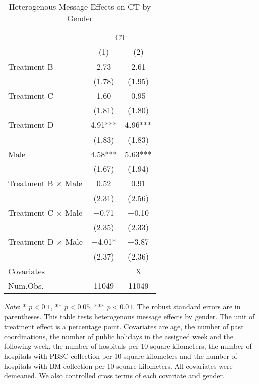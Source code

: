 \documentclass[12pt, a4paper]{article}
\begin{document}
\begin{table}[H]

\caption{\label{tab:lm-interaction-gender-test}Heterogenous Message Effects on CT by Gender}
\centering
\fontsize{8}{10}\selectfont
\begin{threeparttable}
\begin{tabular}[t]{>{\raggedright\arraybackslash}p{20em}cc}
\toprule
\multicolumn{1}{c}{ } & \multicolumn{2}{c}{CT} \\
\cmidrule(l{3pt}r{3pt}){2-3}
  & (1) & (2)\\
\midrule
Treatment B & \num{2.73} & \num{2.61}\\
 & (\num{1.78}) & (\num{1.95})\\
Treatment C & \num{1.60} & \num{0.95}\\
 & (\num{1.81}) & (\num{1.80})\\
Treatment D & \num{4.91}*** & \num{4.96}***\\
 & (\num{1.83}) & (\num{1.83})\\
Male & \num{4.58}*** & \num{5.63}***\\
 & (\num{1.67}) & (\num{1.94})\\
Treatment B $\times$ Male & \num{0.52} & \num{0.91}\\
 & (\num{2.31}) & (\num{2.56})\\
Treatment C $\times$ Male & \num{-0.71} & \num{-0.10}\\
 & (\num{2.35}) & (\num{2.33})\\
Treatment D $\times$ Male & \num{-4.01}* & \num{-3.87}\\
 & (\num{2.37}) & (\num{2.36})\\
\midrule
Covariates &  & X\\
Num.Obs. & \num{11049} & \num{11049}\\
\bottomrule
\end{tabular}
\begin{tablenotes}
\item \emph{Note}: * $p < 0.1$, ** $p < 0.05$, *** $p < 0.01$. The robust standard errors are in parentheses. This table tests heterogenous message effects by gender. The unit of treatment effect is a percentage point. Covariates are age, the number of past coordinations, the number of public holidays in the assigned week and the following week, the number of hospitals per 10 square kilometers, the number of hospitals with PBSC collection per 10 square kilometers and the number of hospitals with BM collection per 10 square kilometers. All covariates were demeaned. We also controlled cross terms of each covariate and gender.
\end{tablenotes}
\end{threeparttable}
\end{table}
\end{document}
